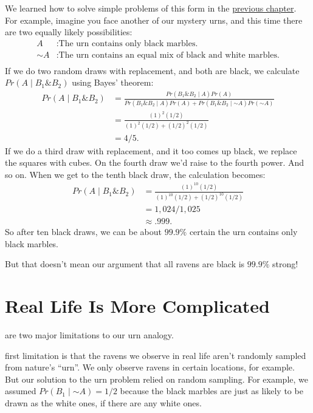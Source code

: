 \documentclass[justified]{tufte-book}
\newcommand{\given}{\mid}
\renewcommand{\neg}{\mathbin{\sim}}
\renewcommand{\wedge}{\mathbin{\&}}
\newcommand{\p}{Pr}
\theoremstyle{definition}
\theoremstyle{definition}
\theoremstyle{definition}
\theoremstyle{remark}
\begin{document}
We learned how to solve simple problems of this form in the \protect\hyperlink{multiple-draws}{previous chapter}. For example, imagine you face another of our mystery urns, and this time there are two equally likely possibilities:
\[
  \begin{aligned}
    A      &: \mbox{The urn contains only black marbles.} \\
    \neg A &: \mbox{The urn contains an equal mix of black and white marbles.} \\
  \end{aligned}
\]
If we do two random draws with replacement, and both are black, we calculate \(\p(A \given B_1 \wedge B_2)\) using Bayes' theorem:
\[
  \begin{aligned}
    \p(A \given B_1 \wedge B_2) &= \frac{\p(B_1 \wedge B_2 \given A)\p(A)}{\p(B_1 \wedge B_2 \given A) \p(A) + \p(B_1 \wedge B_2 \given \neg A) \p(\neg A)} \\ 
    &= \frac{(1)^2(1/2)}{(1)^2(1/2) + (1/2)^2(1/2)}\\
    &= 4/5.
  \end{aligned}
\]
If we do a third draw with replacement, and it too comes up black, we replace the squares with cubes. On the fourth draw we'd raise to the fourth power. And so on. When we get to the tenth black draw, the calculation becomes:
\[
  \begin{aligned}
    \p(A \given B_1 \wedge B_2) &= \frac{(1)^{10}(1/2)}{(1)^{10}(1/2) + (1/2)^{10}(1/2)}\\
    &= 1,024/1,025\\
    &\approx .999.
  \end{aligned}
\]
So after ten black draws, we can be about \(99.9\%\) certain the urn contains only black marbles.

But that doesn't mean our argument that all ravens are black is \(99.9\%\) strong!

\hypertarget{real-life-is-more-complicated}{%
\section{Real Life Is More Complicated}\label{real-life-is-more-complicated}}

 are two major limitations to our urn analogy.

 first limitation is that the ravens we observe in real life aren't randomly sampled from nature's ``urn''. We only observe ravens in certain locations, for example. But our solution to the urn problem relied on random sampling. For example, we assumed \(\p(B_1 \given \neg A) = 1/2\) because the black marbles are just as likely to be drawn as the white ones, if there are any white ones.
\end{document}
